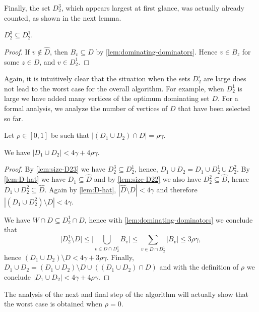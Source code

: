 Finally, the set $D_2^3$, which appears largest at first glance, was
actually already counted, as shown in the next lemma.
\begin{lemma}\label{lem:size-D23}
  $D_2^3\subseteq D_2^1$.
\end{lemma}
\begin{proof}
  If $v\not\in \hat{D}$, then $B_v\subseteq D$ by
  \cref{lem:dominating-dominators}.  Hence $v\in B_z$ for some
  $z\in D$, and $v\in D_2^1$.
\end{proof}

Again, it is intuitively clear that the situation when the sets
$D_2^i$ are large does not lead to the worst case for the overall
algorithm. For example, when $D_2^1$ is large we have added many
vertices of the optimum dominating set $D$. For a formal analysis, we
analyze the number of vertices of $D$ that have been selected so far.

\begin{tcolorbox}
  Let $\rho\in [0,1]$ be such that $|(D_1 \cup D_2)\cap D| =\rho\gamma$.
\end{tcolorbox}

\smallskip
\begin{lemma}\label{lem:size-D12}
  We have $|D_1\cup D_2| < 4\gamma+4\rho\gamma$.
\end{lemma}
\begin{proof}
  By \cref{lem:size-D23} we have $D_2^3\subseteq D_2^1$, hence,
  $D_1\cup D_2=D_1\cup D_2^1\cup D_2^2$. By \cref{lem:D-hat} we have
  $D_1 \subseteq \hat D$ and by \cref{lem:size-D22} we also have
  $D_2^2 \subseteq \hat D$, hence $D_1\cup D_2^2\subseteq \hat D$.
  Again by \cref{lem:D-hat}, $|\hat D \setminus D|<4\gamma$ and
  therefore $|(D_1 \cup D_2^2 )\setminus D| < 4 \gamma$.

  We have $W\cap D\subseteq D_2^1\cap D$, hence with
  \cref{lem:dominating-dominators} we conclude that
  \[
    \big\vert D_2^1 \setminus D \big\vert \leq
    \Big\vert\bigcup\limits_{v\in D \cap D_2^1}B_v\Big\vert \leq
    \sum\limits_{v\in D \cap D_2^1} |B_v| \leq 3\rho\gamma,
  \]
  hence $(D_1\cup D_2)\setminus D<4\gamma+3\rho\gamma$. Finally,
  $D_1\cup D_2=(D_1\cup D_2)\setminus D\cup ((D_1\cup D_2)\cap D)$ and
  with the definition of $\rho$ we conclude
  $|D_1\cup D_2|<4\gamma + 4\rho\gamma$.
\end{proof}

The analysis of the next and final step of the algorithm will actually
show that the worst case is obtained when $\rho=0$.

